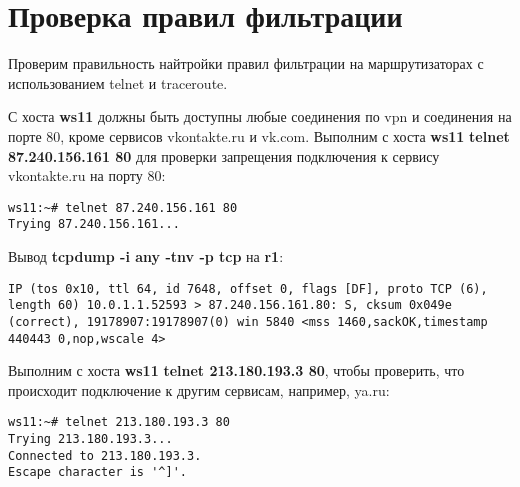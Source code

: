 \documentclass[a4paper,12pt]{article}
\begin{document}
\section{Проверка правил фильтрации}

Проверим правильность найтройки правил фильтрации на маршрутизаторах
с использованием  telnet и traceroute.

С хоста \textbf{ws11} должны быть доступны любые соединения по vpn и соединения на
порте 80, кроме сервисов vkontakte.ru и vk.com.
Выполним с хоста \textbf{ws11} \textbf{telnet 87.240.156.161 80} для проверки запрещения подключения
к сервису vkontakte.ru на порту 80:
\begin{Verbatim}
ws11:~# telnet 87.240.156.161 80
Trying 87.240.156.161...
\end{Verbatim}

Вывод \textbf{tcpdump -i any -tnv -p tcp} на \textbf{r1}:
\begin{Verbatim}
IP (tos 0x10, ttl 64, id 7648, offset 0, flags [DF], proto TCP (6), length 60) 10.0.1.1.52593 > 87.240.156.161.80: S, cksum 0x049e (correct), 19178907:19178907(0) win 5840 <mss 1460,sackOK,timestamp 440443 0,nop,wscale 4>
\end{Verbatim}

Выполним с хоста \textbf{ws11} \textbf{telnet 213.180.193.3 80},  чтобы проверить, что
происходит подключение к другим сервисам, например, ya.ru:
\begin{Verbatim}
ws11:~# telnet 213.180.193.3 80
Trying 213.180.193.3...
Connected to 213.180.193.3.
Escape character is '^]'.
\end{Verbatim}
\end{document}

